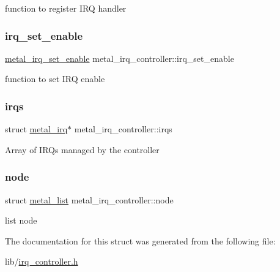 function to register I\+RQ handler \mbox{\label{structmetal__irq__controller_a4aead8f0a0116ec6dbdda3c4114d5545}} 
\subsubsection{\texorpdfstring{irq\+\_\+set\+\_\+enable}{irq\_set\_enable}}
{\footnotesize\ttfamily \hyperlink{group__irq_ga125a768ecd5924b3da91b6ebb6820e9a}{metal\+\_\+irq\+\_\+set\+\_\+enable} metal\+\_\+irq\+\_\+controller\+::irq\+\_\+set\+\_\+enable}

function to set I\+RQ enable \mbox{\label{structmetal__irq__controller_ade636056520b3ad5d7d719d7276a5ead}} 
\subsubsection{\texorpdfstring{irqs}{irqs}}
{\footnotesize\ttfamily struct \hyperlink{structmetal__irq}{metal\+\_\+irq}$\ast$ metal\+\_\+irq\+\_\+controller\+::irqs}

Array of I\+R\+Qs managed by the controller \mbox{\label{structmetal__irq__controller_a26e87c0da6978319075db2289b901749}} 
\subsubsection{\texorpdfstring{node}{node}}
{\footnotesize\ttfamily struct \hyperlink{structmetal__list}{metal\+\_\+list} metal\+\_\+irq\+\_\+controller\+::node}

list node 

The documentation for this struct was generated from the following file\+:\begin{DoxyCompactItemize}
\item 
lib/\hyperlink{irq__controller_8h}{irq\+\_\+controller.\+h}\end{DoxyCompactItemize}
